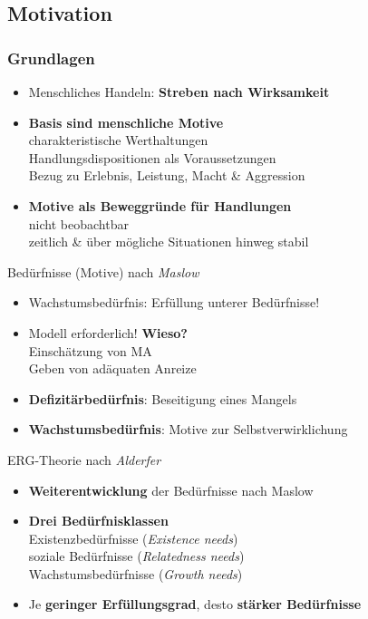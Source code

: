 \documentclass{cheatsheet}
\begin{document}
    \subsection{Motivation}
    \begin{normbox}{\subsubsection{Grundlagen}}
        \begin{itemize}
            \item Menschliches Handeln: \textbf{Streben nach Wirksamkeit}
            \item \textbf{Basis sind menschliche Motive}\\
            \ra charakteristische Werthaltungen\\
            \ra Handlungsdispositionen als Voraussetzungen\\
            \ra Bezug zu Erlebnis, Leistung, Macht \& Aggression 
            \item \textbf{Motive als Beweggründe für Handlungen}\\
            \ra nicht beobachtbar\\
            \ra zeitlich \& über mögliche Situationen hinweg stabil
        \end{itemize}
    \end{normbox}
    \begin{warningbox}{Bedürfnisse (Motive) nach \emph{Maslow}}
        \begin{itemize}
            \item Wachstumsbedürfnis: Erfüllung unterer Bedürfnisse!
            \item Modell erforderlich! \textbf{Wieso?}\\
            \ra Einschätzung von MA\\
            \ra Geben von adäquaten Anreize
            \item \textbf{Defizitärbedürfnis}: Beseitigung eines Mangels
            \item \textbf{Wachstumsbedürfnis}: Motive zur Selbstverwirklichung
        \end{itemize}
    \end{warningbox}
    \begin{warningbox}{ERG-Theorie nach \emph{Alderfer}}
        \begin{itemize}
            \item \textbf{Weiterentwicklung} der Bedürfnisse nach Maslow
            \item \textbf{Drei Bedürfnisklassen}\\
            \ra Existenzbedürfnisse (\emph{Existence needs})\\
            \ra soziale Bedürfnisse (\emph{Relatedness needs})\\
            \ra Wachstumsbedürfnisse (\emph{Growth needs})
            \item Je \textbf{geringer Erfüllungsgrad}, desto \textbf{stärker Bedürfnisse}
        \end{itemize}
    \end{warningbox}
\end{document}
